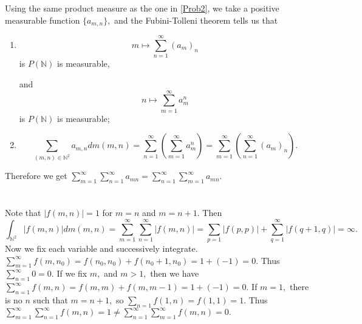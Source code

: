 \documentclass{article}
\begin{document}
\section{} %
Using the same product measure as the one in \ref{Prob2}, we take a positive measurable function $\{a_{m,n}\},$ and the Fubini-Tolleni theorem tells us that 
\begin{enumerate}
	\item $$m \mapsto \sum_{n=1}^{\infty} (a_m)_{n} $$ is $P(\mathbb{N})$ is measurable, 
	
	and $$n \mapsto \sum_{m=1}^{\infty}a^{n}_m $$ is $P(\mathbb{N})$ is measurable;
	\item $$\sum_{(m,n) \in \mathbb{N}^2}a_{m,n}dm(m,n) = \sum_{n=1}^{\infty} \left( \sum_{m=1}^{\infty}a^{n}_m \right)= \sum_{m=1}^{\infty} \left( \sum_{n=1}^{\infty}(a_m)_{n} \right).$$
\end{enumerate}

Therefore we get $\sum_{m=1}^{\infty} \sum_{n=1}^{\infty} a_{mn}= \sum_{n=1}^{\infty} \sum_{m=1}^{\infty} a_{mn}.$

\section{} %
Note that $|f(m,n)|=1$ for $m=n$ and $m=n+1.$ Then $$\int_{\mathbb{N}^2} |f(m,n)| dm(m,n)= \sum_{m=1}^{\infty} \sum_{n=1}^{\infty} |f(m,n)| = \sum_{p=1} |f(p,p)| + \sum_{q=1}^{\infty}|f(q+1,q)|=\infty.$$
Now we fix each variable and successively integrate. $\sum_{m=1}^{\infty} f(m,n_0)= f(n_0,n_0)+f(n_0+1,n_0)=1+ (-1)=0.$ Thus $\sum_{n=1}^{\infty}0=0.$ If we fix $m,$ and $m>1,$ then we have $\sum_{n=1}^{\infty} f(m,n)= f(m,m)+f(m,m-1)=1+(-1)=0.$ If $m=1,$ there is no $n$ such that $ m=n+1,$ so $\sum_{n=1}f(1,n)=f(1,1)=1.$ Thus $ \sum_{m=1}^{\infty} \sum_{n=1}^{\infty} f(m,n) = 1 \neq \sum_{n=1}^{\infty} \sum_{m=1}^{\infty} f(m,n) = 0.$
\end{document}
